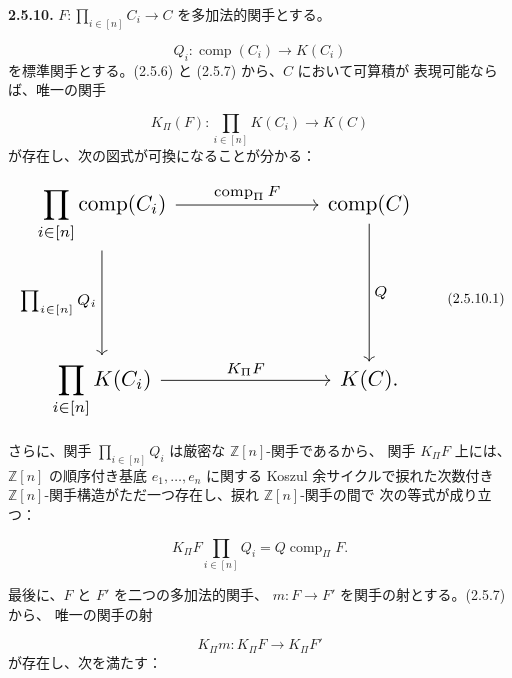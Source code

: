 \clearpage
{}%
\noindent\textbf{2.5.10.}\quad
{}
$F\colon\prod_{i\in[n]}C_i\longrightarrow C$ を多加法的関手とする。

\begin{equation*}
  Q_i\colon\operatorname{comp}(C_i)\longrightarrow K(C_i)
\end{equation*}
を標準関手とする。(2.5.6) と (2.5.7) から、$C$ において可算積が
表現可能ならば、唯一の関手

\begin{equation*}
  K_{\Pi}(F)\colon
  \prod_{i\in[n]}K(C_i)\longrightarrow K(C)
\end{equation*}
が存在し、次の図式が可換になることが分かる：

\begin{equation}
  \resizebox{0.84\textwidth}{!}{%
    $\begin{tikzcd}[ampersand replacement=\&,column sep=6.8em,row sep=5.0em]
      \displaystyle\prod_{i\in[n]}\operatorname{comp}(C_i)
        \arrow[r,"{\operatorname{comp}_{\Pi}F}"]
        \arrow[d,"{\prod_{i\in[n]}Q_i}"']
        \& \operatorname{comp}(C)
          \arrow[d,"Q"] \\
      \displaystyle\prod_{i\in[n]}K(C_i)
        \arrow[r,"{K_{\Pi}F}"]
        \& K(C)\mathpunct{.}
    \end{tikzcd}$%
  }
  \tag{2.5.10.1}
\end{equation}

さらに、関手 $\prod_{i\in[n]}Q_i$ は厳密な $\mathbb Z[n]$-関手であるから、
関手 $K_{\Pi}F$ 上には、$\mathbb Z[n]$ の順序付き基底
$e_1,\ldots,e_n$ に関する Koszul 余サイクルで捩れた次数付き
$\mathbb Z[n]$-関手構造がただ一つ存在し、捩れ $\mathbb Z[n]$-関手の間で
次の等式が成り立つ：

\begin{equation}
  K_{\Pi}F\prod_{i\in[n]}Q_i
  =Q\operatorname{comp}_{\Pi}F.
  \tag{2.5.10.2}
\end{equation}

最後に、$F$ と $F'$ を二つの多加法的関手、
$m\colon F\longrightarrow F'$ を関手の射とする。(2.5.7) から、
唯一の関手の射

\begin{equation}
  K_{\Pi}m\colon K_{\Pi}F\longrightarrow K_{\Pi}F'
  \tag{2.5.10.3}
\end{equation}
が存在し、次を満たす：

